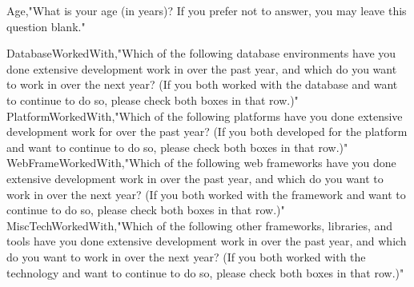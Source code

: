\documentclass{dyplom}
\begin{document}
Age,"What is your age (in years)? If you prefer not to answer, you may leave this question blank."


DatabaseWorkedWith,"Which of the following database environments have you done extensive development work in over the past year, and which do you want to work in over the next year?   (If you both worked with the database and want to continue to do so, please check both boxes in that row.)"
PlatformWorkedWith,"Which of the following platforms have you done extensive development work for over the past year?   (If you both developed for the platform and want to continue to do so, please check both boxes in that row.)"
WebFrameWorkedWith,"Which of the following web frameworks have you done extensive development work in over the past year, and which do you want to work in over the next year? (If you both worked with the framework and want to continue to do so, please check both boxes in that row.)"
MiscTechWorkedWith,"Which of the following other frameworks, libraries, and tools have you done extensive development work in over the past year, and which do you want to work in over the next year? (If you both worked with the technology and want to continue to do so, please check both boxes in that row.)"
\end{document}
